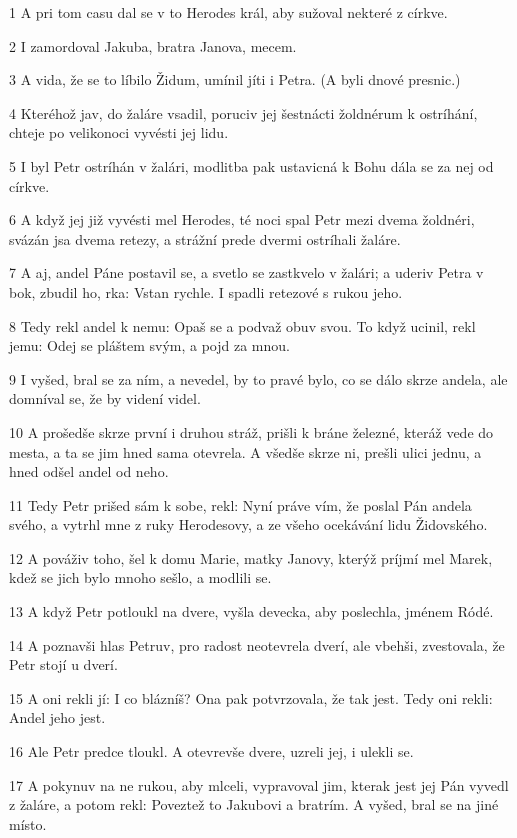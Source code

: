 \par 1 A pri tom casu dal se v to Herodes král, aby sužoval nekteré z církve.
\par 2 I zamordoval Jakuba, bratra Janova, mecem.
\par 3 A vida, že se to líbilo Židum, umínil jíti i Petra. (A byli dnové presnic.)
\par 4 Kteréhož jav, do žaláre vsadil, poruciv jej šestnácti žoldnérum k ostríhání, chteje po velikonoci vyvésti jej lidu.
\par 5 I byl Petr ostríhán v žalári, modlitba pak ustavicná k Bohu dála se za nej od církve.
\par 6 A když jej již vyvésti mel Herodes, té noci spal Petr mezi dvema žoldnéri, svázán jsa dvema retezy, a strážní prede dvermi ostríhali žaláre.
\par 7 A aj, andel Páne postavil se, a svetlo se zastkvelo v žalári; a uderiv Petra v bok, zbudil ho, rka: Vstan rychle. I spadli retezové s rukou jeho.
\par 8 Tedy rekl andel k nemu: Opaš se a podvaž obuv svou. To když ucinil, rekl jemu: Odej se pláštem svým, a pojd za mnou.
\par 9 I vyšed, bral se za ním, a nevedel, by to pravé bylo, co se dálo skrze andela, ale domníval se, že by videní videl.
\par 10 A prošedše skrze první i druhou stráž, prišli k bráne železné, kteráž vede do mesta, a ta se jim hned sama otevrela. A všedše skrze ni, prešli ulici jednu, a hned odšel andel od neho.
\par 11 Tedy Petr prišed sám k sobe, rekl: Nyní práve vím, že poslal Pán andela svého, a vytrhl mne z ruky Herodesovy, a ze všeho ocekávání lidu Židovského.
\par 12 A pováživ toho, šel k domu Marie, matky Janovy, kterýž príjmí mel Marek, kdež se jich bylo mnoho sešlo, a modlili se.
\par 13 A když Petr potloukl na dvere, vyšla devecka, aby poslechla, jménem Ródé.
\par 14 A poznavši hlas Petruv, pro radost neotevrela dverí, ale vbehši, zvestovala, že Petr stojí u dverí.
\par 15 A oni rekli jí: I co blázníš? Ona pak potvrzovala, že tak jest. Tedy oni rekli: Andel jeho jest.
\par 16 Ale Petr predce tloukl. A otevrevše dvere, uzreli jej, i ulekli se.
\par 17 A pokynuv na ne rukou, aby mlceli, vypravoval jim, kterak jest jej Pán vyvedl z žaláre, a potom rekl: Poveztež to Jakubovi a bratrím. A vyšed, bral se na jiné místo.
